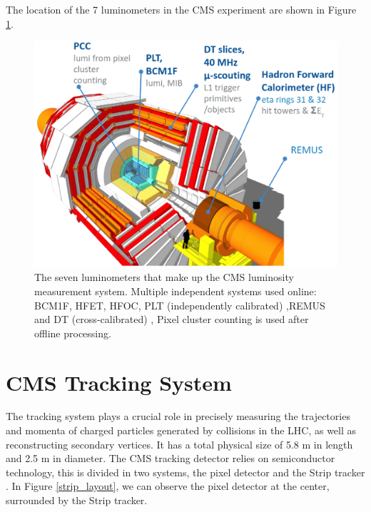 The location of the 7 luminometers in the CMS experiment are shown in Figure \ref{luminometers}.

\begin{center}
  \begin{figure}[ht]
    \centering
    \includegraphics[scale=.3]{Chapter2/detectors.png}
    \caption[Layout of the luminometers in the CMS detector]{The seven luminometers that make up the CMS luminosity measurement system. Multiple independent systems used online: BCM1F, HFET, HFOC, PLT (independently calibrated) ,REMUS and  DT (cross-calibrated) , Pixel cluster counting is used after offline processing.}
    \label{luminometers}
  \end{figure}
\end{center}

\section{CMS Tracking System}

The tracking system plays a crucial role in precisely measuring the trajectories and momenta of charged particles generated by collisions in the LHC, as well as reconstructing secondary vertices. It has a total physical size of 5.8 m in length and 2.5 m in diameter. 
The CMS tracking detector relies on semiconductor technology, this is divided in two systems, the pixel detector and the Strip tracker \cite{CMS_Exp_2008}. In Figure \ref{strip_layout}, we can observe the pixel detector at the center, surrounded by the Strip tracker.\\


